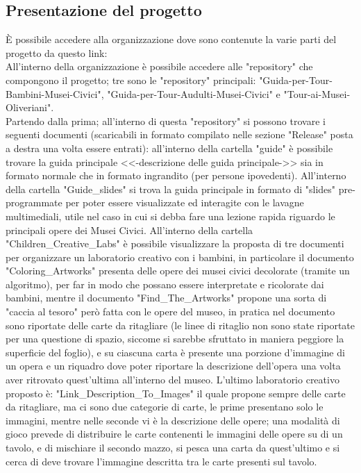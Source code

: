 \documentclass[hidelinks,12pt,a4paper]{article}
\begin{document}
\begin{flushleft}
				 \subsection{Presentazione del progetto}
				 È possibile accedere alla organizzazione dove sono contenute la varie parti del progetto da questo link:\\
				 All'interno della organizzazione è possibile accedere alle "repository" che compongono il progetto; tre sono le "repository" principali: "Guida-per-Tour-Bambini-Musei-Civici", "Guida-per-Tour-Audulti-Musei-Civici" e "Tour-ai-Musei-Oliveriani".\\
				 Partendo dalla prima; all'interno di questa "repository" si possono trovare i seguenti documenti (scaricabili in formato compilato nelle sezione "Release" posta a destra una volta essere entrati): all'interno della cartella "guide" è possibile trovare la guida principale <<-descrizione delle guida principale->> sia in formato normale che in formato ingrandito (per persone ipovedenti). All'interno della cartella "Guide_slides" si trova la guida principale in formato di "slides" pre-programmate per poter essere visualizzate ed interagite con le lavagne multimediali, utile nel caso in cui si debba fare una lezione rapida riguardo le principali opere dei Musei Civici. All'interno della cartella "Children_Creative_Labs" è possibile visualizzare la proposta di tre documenti per organizzare un laboratorio creativo con i bambini, in particolare il documento "Coloring_Artworks" presenta delle opere dei musei civici decolorate (tramite un algoritmo), per far in modo che possano essere interpretate e ricolorate dai bambini, mentre il documento "Find_The_Artworks" propone una sorta di "caccia al tesoro" però fatta con le opere del museo, in pratica nel documento sono riportate delle carte da ritagliare (le linee di ritaglio non sono state riportate per una questione di spazio, siccome si sarebbe sfruttato in maniera peggiore la superficie del foglio), e su ciascuna carta è presente una porzione d'immagine di un opera e un riquadro dove poter riportare la descrizione dell'opera una volta aver ritrovato quest'ultima all'interno del museo. L'ultimo laboratorio creativo proposto è: "Link_Description_To_Images" il quale propone sempre delle carte da ritagliare, ma ci sono due categorie di carte, le prime presentano solo le immagini, mentre nelle seconde vi è la descrizione delle opere; una modalità di gioco prevede di distribuire le carte contenenti le immagini delle opere su di un tavolo, e di mischiare il secondo mazzo, si pesca una carta da quest'ultimo e si cerca di deve trovare l'immagine descritta tra le carte presenti sul tavolo.\\

\end{flushleft}
\end{document}
